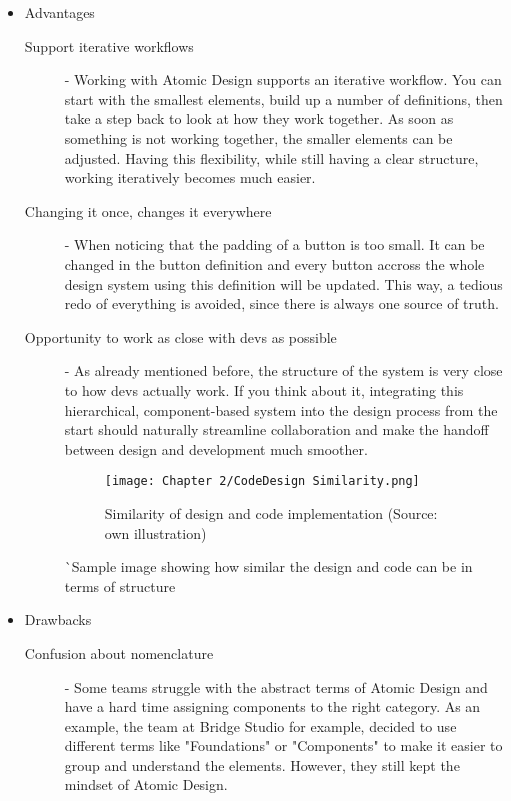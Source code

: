\begin{itemize}
	\item Advantages
	      \begin{description}
		      \item[Support iterative workflows] - Working with Atomic Design supports an iterative
		            workflow. You can start with the smallest elements, build up a number of
		            definitions, then take a step back to look at how they work together. As soon as
		            something is not working together, the smaller elements can be adjusted. Having
		            this flexibility, while still having a clear structure, working iteratively
		            becomes much easier. 
		      \item[Changing it once, changes it everywhere] - When noticing that the padding
		            of a button is too small. It can be changed in the button definition and every
		            button accross the whole design system using this definition will be updated.
		            This way, a tedious redo of everything is avoided, since there is always one
		            source of truth.
		      \item[Opportunity to work as close with devs as possible] - As already mentioned
		            before, the structure of the system is very close to how devs actually work.
		            If you think about it, integrating this hierarchical, component-based system
		            into the design process from the start should naturally streamline collaboration
		            and make the handoff between design and development much smoother.

		            \begin{figure}[h!]
			            \begin{center}
				            \texttt{[image: Chapter 2/CodeDesign Similarity.png]}
				            \caption{Similarity of design and code implementation (Source: own illustration)}
			            \end{center}
		            \end{figure}
		            ^^ Sample image showing how similar the design and code can be in terms of structure
	      \end{description}
	\item Drawbacks
	      \begin{description}
		      \item[Confusion about nomenclature] - Some teams struggle with the abstract terms of
		            Atomic Design and have a hard time assigning components to the right category.
		            As an example, the team at Bridge Studio for example, decided to use different
		            terms like "Foundations" or "Components" to make it easier to group and
		            understand the elements. However, they still kept the mindset of Atomic Design.


\end{description}
\end{itemize}
